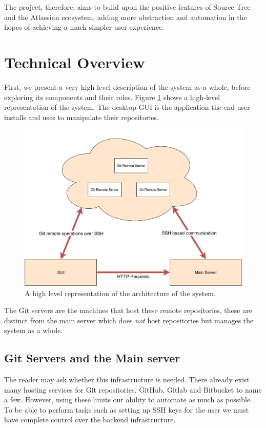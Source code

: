 The project, therefore, aims to build upon the positive features of Source Tree and the Atlassian ecosystem, adding more abstraction and automation in the hopes of achieving a much simpler user experience.

\section{Technical Overview}

First, we present a very high-level description of the system as a whole, before exploring its components and their roles. Figure \ref{fig:highlevel} shows a high-level representation of the system. The desktop GUI is the application the end user installs and uses to manipulate their repositories.

\begin{figure} 
    \centering
    \includegraphics[scale = 0.5]{figures/highlevel.pdf}
    \caption{A high level representation of the architecture of the system. }
    \label{fig:highlevel}
\end{figure}

The Git servers are the machines that host these remote repositories, these are distinct from the main server which does \emph{not} host repositories but manages the system as a whole.

\subsection{Git Servers and the Main server}

The reader may ask whether this infrastructure is needed. There already exist many hosting services for Git repositories. GitHub, Gitlab and Bitbucket to name a few. However, using these limits our ability to automate as much as possible. To be able to perform tasks such as setting up SSH keys for the user we must have complete control over the backend infrastructure. 

